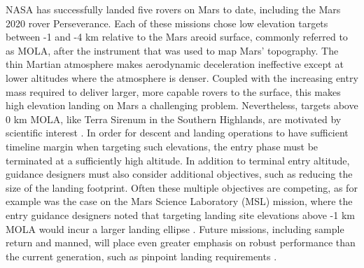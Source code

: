 \documentclass[journal ]{new-aiaa}
\begin{document}
\lettrine{N}{ASA} has successfully landed five rovers on Mars to date, including the Mars 2020 rover Perseverance. Each of these missions chose low elevation targets between -1 and -4 km relative to the Mars areoid surface, commonly referred to as MOLA, after the instrument that was used to map Mars' topography. The thin Martian atmosphere makes aerodynamic deceleration ineffective except at lower altitudes where the atmosphere is denser. Coupled with the increasing entry mass required to deliver larger, more capable rovers to the surface, this makes high elevation landing on Mars a challenging problem. Nevertheless, targets above 0 km MOLA, like Terra Sirenum in the Southern Highlands, are motivated by scientific interest \cite{MarsWater}. In order for descent and landing operations to have sufficient timeline margin \cite{BraunMarsEDL,MSL_EDL2} when targeting such elevations, the entry phase must be terminated at a sufficiently high altitude.
In addition to terminal entry altitude, guidance designers must also consider additional objectives, such as reducing the size of the landing footprint. Often these multiple objectives are competing, as for example was the case on the Mars Science Laboratory (MSL) mission, where the entry guidance designers noted that targeting landing site elevations above -1 km MOLA would incur a larger landing ellipse \cite{MSL_EDL2}. 
Future missions, including sample return \cite{MSR} and manned, will place even greater emphasis on robust performance than the current generation, such as pinpoint landing requirements \cite{EvolvableMars}. 
\end{document}
